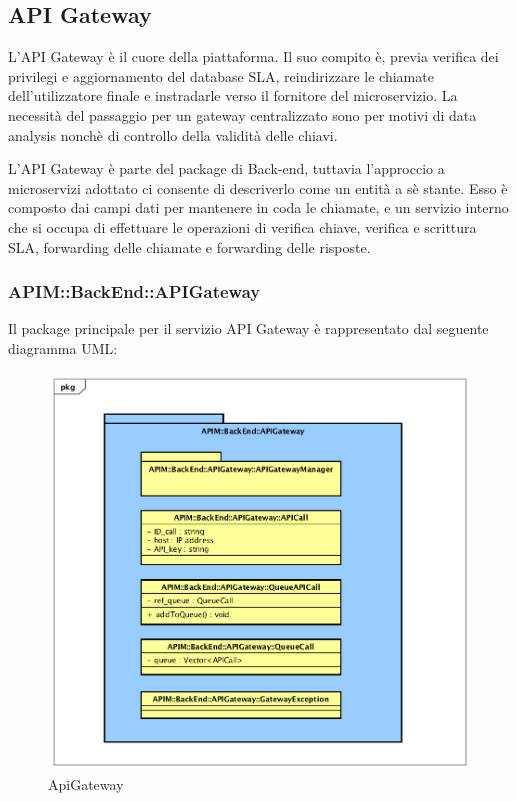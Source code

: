 \subsection{API Gateway}

L'API Gateway è il cuore della piattaforma. Il suo compito è, previa verifica dei privilegi e aggiornamento del database SLA, reindirizzare le chiamate dell'utilizzatore finale e instradarle verso il fornitore del microservizio.  La necessità del passaggio per un gateway centralizzato sono per motivi di data analysis nonchè di controllo della validità delle chiavi.

L'API Gateway è parte del package di Back-end, tuttavia l'approccio a microservizi adottato ci consente di descriverlo come un entità a sè stante. Esso è composto dai campi dati per mantenere in coda le chiamate, e un servizio interno che si occupa di effettuare le operazioni di verifica chiave, verifica e scrittura SLA, forwarding delle chiamate e forwarding delle risposte. 

\subsubsection{APIM::BackEnd::APIGateway}

Il package principale per il servizio API Gateway è rappresentato dal seguente diagramma UML: 

\begin{figure}[!htbp]
	\centering
	\includegraphics[scale=0.45]{UML/DiagrammiPackage/ApiGateway.png}
	\caption{ApiGateway}
\end{figure}



